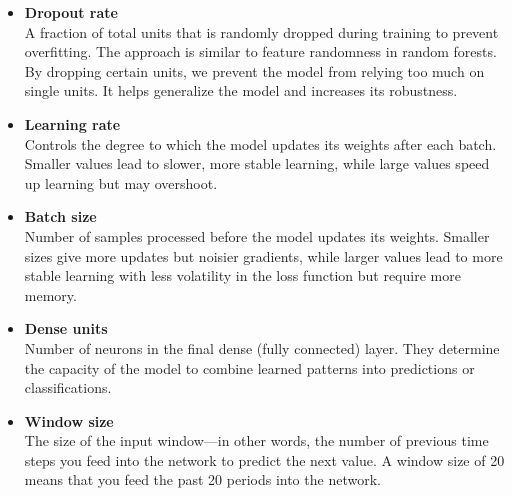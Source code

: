 \documentclass[a4paper,12pt]{report}
\begin{document}
\begin{itemize}

  \item \textbf{Dropout rate} \\
  A fraction of total units that is randomly dropped during training to prevent overfitting. The approach is similar to feature randomness in random forests. By dropping certain units, we prevent the model from relying too much on single units. It helps generalize the model and increases its robustness.

  \item \textbf{Learning rate} \\
  Controls the degree to which the model updates its weights after each batch. Smaller values lead to slower, more stable learning, while large values speed up learning but may overshoot.

  \item \textbf{Batch size} \\
  Number of samples processed before the model updates its weights. Smaller sizes give more updates but noisier gradients, while larger values lead to more stable learning with less volatility in the loss function but require more memory.

  \item \textbf{Dense units} \\
  Number of neurons in the final dense (fully connected) layer. They determine the capacity of the model to combine learned patterns into predictions or classifications.

  \item \textbf{Window size} \\
  The size of the input window—in other words, the number of previous time steps you feed into the network to predict the next value. A window size of 20 means that you feed the past 20 periods into the network.
\end{itemize}
\end{document}
